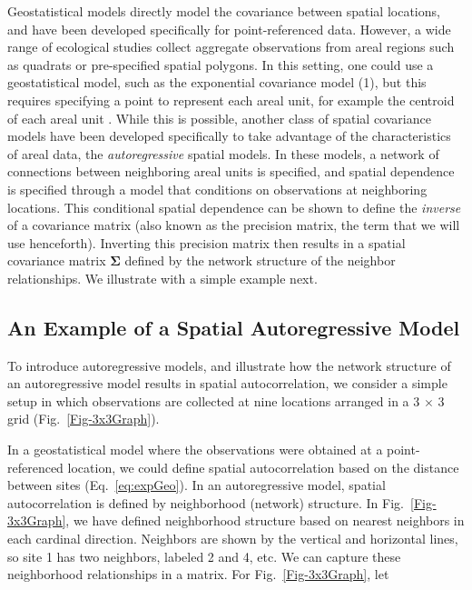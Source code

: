 \documentclass[11pt, titlepage]{article}\usepackage[]{graphicx}\usepackage[]{color}
\begin{document}
\begin{spacing}{1.9}
\begin{flushleft}
Geostatistical models directly model the covariance between spatial locations, and have been developed specifically for point-referenced data.  However, a wide range of ecological studies collect aggregate observations from areal regions such as quadrats or pre-specified spatial polygons.  In this setting, one could use a geostatistical model, such as the exponential covariance model (1), but this requires specifying a point to represent each areal unit, for example the centroid of each areal unit \citep[e.g.,][]{Ver:Cres:spat:1993}.  While this is possible, another class of spatial covariance models have been developed specifically to take advantage of the characteristics of areal data, the \emph{autoregressive} spatial models.  In these models, a network of connections between neighboring areal units is specified, and spatial dependence is specified through a model that conditions on observations at neighboring locations.  This conditional spatial dependence can be shown to define the \emph{inverse} of a covariance matrix (also known as the precision matrix, the term that we will use henceforth).  Inverting this precision matrix then results in a spatial covariance matrix $\boldsymbol\Sigma$ defined by the network structure of the neighbor relationships. We illustrate with a simple example next.   

\subsection*{An Example of a Spatial Autoregressive Model}


To introduce autoregressive models, and illustrate how the network structure of an autoregressive model results in spatial autocorrelation, we consider a simple setup in which observations are collected at nine locations arranged in a 3 $\times$ 3 grid (Fig.~\ref{Fig-3x3Graph}).

In a geostatistical model where the observations were obtained at a point-referenced location, we could define spatial autocorrelation based on the distance between sites (Eq.~\ref{eq:expGeo}).  In an autoregressive model, spatial autocorrelation is defined by neighborhood (network) structure.  In Fig.~\ref{Fig-3x3Graph}, we have defined neighborhood structure based on nearest neighbors in each cardinal direction.  Neighbors are shown by the vertical and horizontal lines, so site 1 has two neighbors, labeled 2 and 4, etc.  We can capture these neighborhood relationships in a matrix.  For Fig.~\ref{Fig-3x3Graph}, let


\end{flushleft}
\end{spacing}
\end{document}
